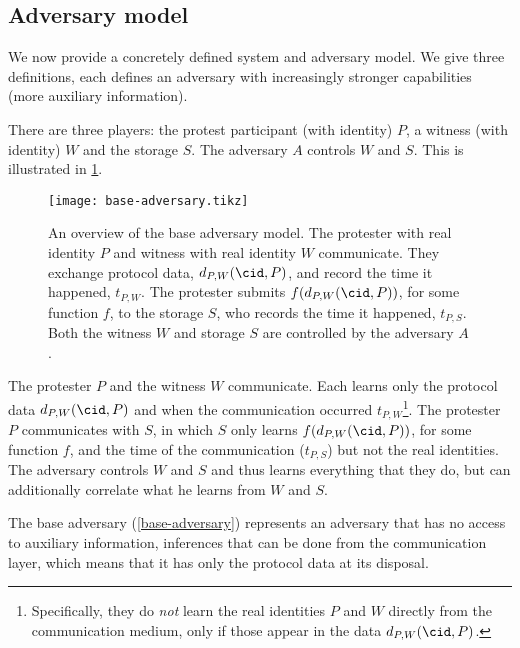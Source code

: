 \subsection{Adversary model}%
\label{formal-adversary-model}

We now provide a concretely defined system and adversary model.
We give three definitions, each defines an adversary with increasingly stronger 
capabilities (\ie more auxiliary information).

There are three players: the protest participant (with identity) \(P\), a 
witness (with identity) \(W\) and the storage \(S\).
The adversary \(A\) controls \(W\) and \(S\).
This is illustrated in \cref{fig:base-adversary}.

\begin{figure}
  \centering
  \texttt{[image: base-adversary.tikz]}
  \caption{\label{fig:base-adversary}%
    An overview of the base adversary model.
    The protester with real identity \(P\) and witness with real identity \(W\) 
    communicate.
    They exchange protocol data, \(d_{P,W}(\cid, P)\), and record the time it 
    happened, \(t_{P,W}\).
    The protester submits \(f(d_{P,W}(\cid, P))\), for some function \(f\), to 
    the storage \(S\), who records the time it happened, \(t_{P,S}\).
    Both the witness \(W\) and storage \(S\) are controlled by the adversary 
    \(A\).
  }
\end{figure}

\begin{definition}%
  \label{base-adversary}
  The protester \(P\) and the witness \(W\) communicate.
  Each learns only the protocol data \(d_{P,W}(\cid, P)\) and when the 
  communication occurred \(t_{P,W}\)\footnote{%
    Specifically, they do \emph{not} learn the real identities \(P\) and \(W\) 
    directly from the communication medium, only if those appear in the data 
    \(d_{P,W}(\cid, P)\).
  }.
  The protester \(P\) communicates with \(S\), in which \(S\) only learns 
  \(f(d_{P,W}(\cid, P))\), for some function \(f\), and the time of the 
  communication (\(t_{P,S}\)) but not the real identities.
  The adversary controls \(W\) and \(S\) and thus learns everything that they 
  do, but can additionally correlate what he learns from \(W\) and \(S\).
\end{definition}

The base adversary (\cref{base-adversary}) represents an adversary that has no 
access to auxiliary information, \eg inferences that can be done from the 
communication layer, which means that it has only the protocol data at its 
disposal.


